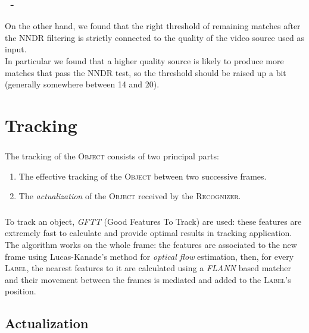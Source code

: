 \documentclass{beamer}
\begin{document}
  \begin{frame}
  	\frametitle{\insertsection\ - \insertsubsection}
	On the other hand, we found that the right threshold of remaining matches
	after the NNDR filtering is strictly connected to the quality of the video
	source used as input.\\
	In particular we found that a higher quality source is likely to produce
	more matches that pass the NNDR test, so the threshold should be raised
	up a bit (generally somewhere between 14 and 20).
  \end{frame}

  \section{Tracking}

  \begin{frame}
    \frametitle{\insertsection}
    The tracking of the \textsc{Object} consists of two principal parts:
    \begin{enumerate}
      \item The effective tracking of the \textsc{Object} between two
        successive frames.
      \item The \emph{actualization} of the \textsc{Object} received by the
        \textsc{Recognizer}.
    \end{enumerate}
  \end{frame}

  \begin{frame}
    \frametitle{\insertsection}
    To track an object, \emph{GFTT} (Good Features To Track) are used:
    these features are extremely fast to calculate and provide optimal results
    in tracking application.\\
    The algorithm works on the whole frame: the features are associated to the
    new frame using Lucas-Kanade's method for \emph{optical flow} estimation,
    then, for every \textsc{Label}, the nearest features to it are calculated
    using a \emph{FLANN} based matcher and their movement between the frames is
    mediated and added to the \textsc{Label}'s position.
  \end{frame}

  \subsection{Actualization}
\end{document}
